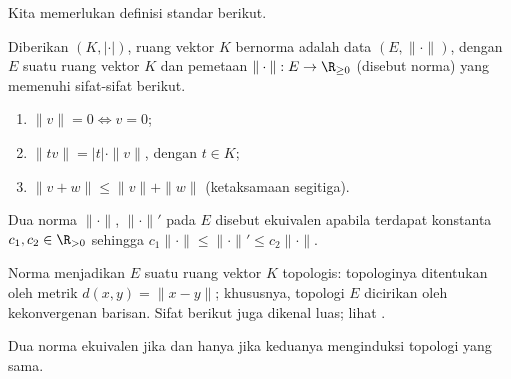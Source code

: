 Kita memerlukan definisi standar berikut.
\begin{definition}[Norma]
	Diberikan $(K, |\cdot|)$, ruang vektor $K$ bernorma adalah data $(E, \|\cdot\|)$, dengan $E$ suatu ruang vektor $K$ dan pemetaan $\|\cdot\|: E \to \R_{\geq 0}$ (disebut norma) yang memenuhi sifat-sifat berikut.
	\begin{enumerate}[\bfseries {NM}.1]
		\item $\|v\| = 0 \iff v =0$;
		\item $\|tv\| = |t| \cdot \|v\|$, dengan $t \in K$;
		\item $\|v+w\| \leq \|v\| + \|w\|$ (ketaksamaan segitiga).
	\end{enumerate}
	Dua norma $\|\cdot\|$, $\|\cdot\|'$ pada $E$ disebut ekuivalen apabila terdapat konstanta $c_1, c_2 \in \R_{>0}$ sehingga $c_1 \|\cdot\| \leq \|\cdot\|' \leq c_2 \|\cdot\|$.
\end{definition}
Norma menjadikan $E$ suatu ruang vektor $K$ topologis: topologinya ditentukan oleh metrik $d(x,y) = \|x-y\|$; khususnya, topologi $E$ dicirikan oleh kekonvergenan barisan. Sifat berikut juga dikenal luas; lihat \cite[Korolari 1.4.17]{Zh1}.
\begin{lemma}
	Dua norma ekuivalen jika dan hanya jika keduanya menginduksi topologi yang sama.
\end{lemma}

